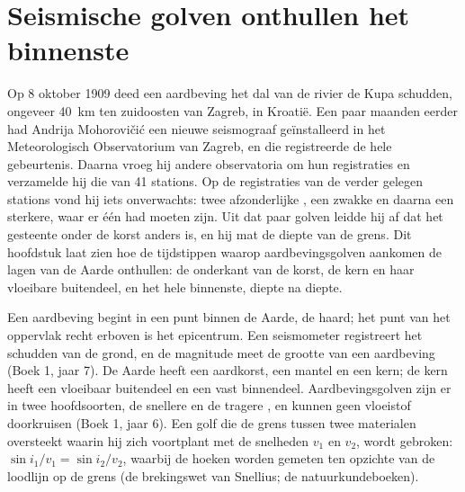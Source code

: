 \chapter{Seismische golven onthullen het binnenste}\label{ch:g11:seismic-structure}

Op 8 oktober 1909 deed een aardbeving het dal van de rivier de Kupa schudden,
ongeveer \qty{40}{km} ten zuidoosten van Zagreb, in Kroatië. Een paar maanden
eerder had Andrija Mohorovičić een nieuwe seismograaf geïnstalleerd in het
Meteorologisch Observatorium van Zagreb, en die registreerde de hele gebeurtenis.
Daarna vroeg hij andere observatoria om hun registraties en verzamelde hij die
van 41 stations. Op de registraties van de verder gelegen stations vond hij iets
onverwachts: twee afzonderlijke , een zwakke en daarna een sterkere, waar
er één had moeten zijn. Uit dat paar golven leidde hij af dat het gesteente onder
de korst anders is, en hij mat de diepte van de grens. Dit hoofdstuk laat zien hoe
de tijdstippen waarop aardbevingsgolven aankomen de lagen van de Aarde onthullen:
de onderkant van de korst, de kern en haar vloeibare buitendeel, en het hele
binnenste, diepte na diepte.

\begin{recall}
Een aardbeving begint in een punt binnen de Aarde, de haard; het punt van het
oppervlak recht erboven is het epicentrum. Een seismometer registreert het
schudden van de grond, en de magnitude meet de grootte van een aardbeving (Boek 1,
jaar 7). De Aarde heeft een aardkorst, een mantel en een kern; de kern heeft een
vloeibaar buitendeel en een vast binnendeel. Aardbevingsgolven zijn er in twee
hoofdsoorten, de snellere  en de tragere , en  kunnen geen
vloeistof doorkruisen (Boek 1, jaar 6). Een golf die de grens tussen twee
materialen oversteekt waarin hij zich voortplant met de snelheden $v_1$ en $v_2$,
wordt gebroken: $\sin i_1/v_1 = \sin i_2/v_2$, waarbij de hoeken worden gemeten
ten opzichte van de loodlijn op de grens (de brekingswet van Snellius; de
natuurkundeboeken).
\end{recall}

